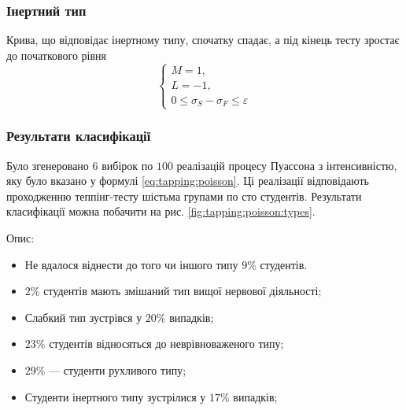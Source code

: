 \subsubsection{Інертний тип}
Крива, що відповідає інертному типу, спочатку спадає,
а під кінець тесту зростає до початкового рівня
\begin{equation*}
  \begin{cases}
    M = 1, \\
    L = -1, \\
    0 \le \sigma_S - \sigma_F \le \varepsilon
  \end{cases}
\end{equation*}

\subsubsection{Результати класифікації}
Було згенеровано $6$ вибірок по $100$ реалізацій процесу Пуассона з
інтенсивністю, яку було вказано у формулі \eqref{eq:tapping:poisson}.
Ці реалізації відповідають проходженню теппінг-тесту шістьма групами по сто
студентів.
Результати класифікації можна побачити на рис. \ref{fig:tapping:poisson:types}.

Опис:
\begin{itemize}
  \item
    Не вдалося віднести до того чи іншого типу $9\%$ студентів.
  \item
    $2\%$ студентів мають змішаний тип вищої нервової діяльності;
  \item
    Слабкий тип зустрівся у $20\%$ випадків;
  \item
    $23\%$ студентів відносяться до неврівноваженого типу;
  \item
    $29\%$ --- студенти рухливого типу;
  \item
    Студенти інертного типу зустрілися у $17\%$ випадків;
\end{itemize}

